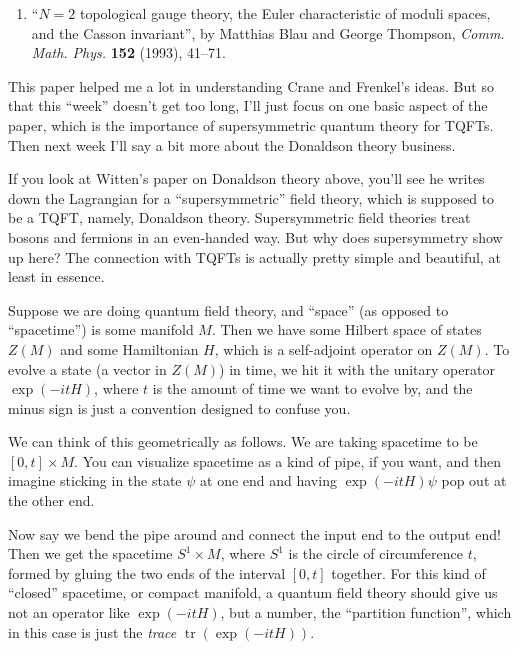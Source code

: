 \documentclass{article}
\def\tightlist{}
\begin{document}
\begin{enumerate}
\def\labelenumi{\arabic{enumi})}
\setcounter{enumi}{2}
\tightlist
\item
  ``\(N = 2\) topological gauge theory, the Euler characteristic of
  moduli spaces, and the Casson invariant'', by Matthias Blau and George
  Thompson, \emph{Comm. Math. Phys.} \textbf{152} (1993), 41--71.
\end{enumerate}

This paper helped me a lot in understanding Crane and Frenkel's ideas.
But so that this ``week'' doesn't get too long, I'll just focus on one
basic aspect of the paper, which is the importance of supersymmetric
quantum theory for TQFTs. Then next week I'll say a bit more about the
Donaldson theory business.

If you look at Witten's paper on Donaldson theory above, you'll see he
writes down the Lagrangian for a ``supersymmetric'' field theory, which
is supposed to be a TQFT, namely, Donaldson theory. Supersymmetric field
theories treat bosons and fermions in an even-handed way. But why does
supersymmetry show up here? The connection with TQFTs is actually pretty
simple and beautiful, at least in essence.

Suppose we are doing quantum field theory, and ``space'' (as opposed to
``spacetime'') is some manifold \(M\). Then we have some Hilbert space
of states \(Z(M)\) and some Hamiltonian \(H\), which is a self-adjoint
operator on \(Z(M)\). To evolve a state (a vector in \(Z(M)\)) in time,
we hit it with the unitary operator \(\exp(-itH)\), where \(t\) is the
amount of time we want to evolve by, and the minus sign is just a
convention designed to confuse you.

We can think of this geometrically as follows. We are taking spacetime
to be \([0,t] \times M\). You can visualize spacetime as a kind of pipe,
if you want, and then imagine sticking in the state \(\psi\) at one end
and having \(\exp(-itH)\psi\) pop out at the other end.

Now say we bend the pipe around and connect the input end to the output
end! Then we get the spacetime \(S^1\times M\), where \(S^1\) is the
circle of circumference \(t\), formed by gluing the two ends of the
interval \([0,t]\) together. For this kind of ``closed'' spacetime, or
compact manifold, a quantum field theory should give us not an operator
like \(\exp(-itH)\), but a number, the ``partition function'', which in
this case is just the \emph{trace} \(\operatorname{tr}(\exp(-itH))\).
\end{document}
